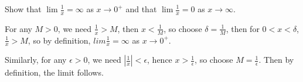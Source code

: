 \begin{example}
    Show that $\lim{\frac{1}{x}}=\infty$ as $x \rightarrow 0^+$ and that $\lim{\frac{1}{x}}=
    0$ as $x \rightarrow \infty$.
\end{example} 
\begin{solution}
    For any $M>0$, we need  $ \frac{1}{x}>M$, then $x<\frac{1}{M}$, so choose 
    $\delta=\frac{1}{M}$, then for $0<x<\delta$,  $ \frac{1}{x}>M$, so by definition, 
    $lim{\frac{1}{x}}=\infty$ as $x \rightarrow 0^+$.

    Similarly, for any  $\epsilon>0$, we need  $|\frac{1}{x}|<\epsilon$, hence 
    $x>\frac{1}{\epsilon}$, so choose $M=\frac{1}{\epsilon}$. Then by definition, the 
    limit follows.
\end{solution}
